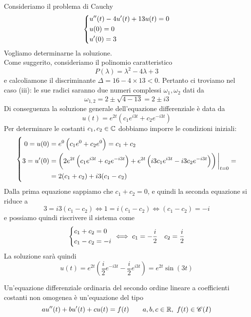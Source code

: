 \begin{example}
    Consideriamo il problema di Cauchy
    \[
    \begin{dcases}
        u''(t)-4u'(t)+13u(t) = 0\\
        u(0) = 0\\
        u'(0)=3
    \end{dcases}
    \]
    Vogliamo determinarne la soluzione. \\
    Come suggerito, consideriamo il polinomio caratteristico 
    \[
    P(\lambda) = \lambda^2-4\lambda +3
    \]
    e calcoliamone il discriminante $\Delta = 16-4\times 13 <0$. Pertanto ci troviamo nel caso (iii): le sue radici saranno due numeri complessi $\omega_1, \omega_2$ dati da
    \[
    \omega_{1,2} = {2\pm \sqrt{4-13}} = 2\pm i3
    \]
    Di conseguenza la soluzione generale dell'equazione differenziale è data da
    \[
    u(t) = e^{2t}\left(c_1 e^{i3t} +c_2 e^{-i3t}\right)
    \]
    Per determinare le costanti $c_1, c_2\in\amsbb{C}$ dobbiamo imporre le condizioni iniziali:
    \[
    \begin{dcases}
        \begin{aligned}
            0 = u(0)&= e^0\left(c_1 e^0 +c_2 e^0\right) = c_1+c_2\\
            3 = u'(0)&= \left(2e^{2t}\left(c_1 e^{i3t}+c_2e^{-i3t}\right)+e^{2t}\left(i3c_1 e^{i3t} -i3c_2 e^{-i3t}\right)\right)\bigg|_{t=0} = \\
            & = 2(c_1+c_2)+i3(c_1-c_2)
        \end{aligned}
    \end{dcases}
    \]
    Dalla prima equazione sappiamo che $c_1+c_2 =0$, e quindi la seconda equazione si riduce a
    \[
    3 = i3(c_1-c_2) \iff 1=i(c_1-c_2) \iff (c_1-c_2) = -i
    \]
    e possiamo quindi riscrivere il sistema come
    \[
    \begin{dcases}
        c_1 + c_2 = 0\\
        c_1 - c_2 = -i 
    \end{dcases} \iff c_1 = -\frac{i}{2} \quad c_2 = \frac{i}{2}
    \]
    La soluzione sarà quindi
    \[
    u(t) = e^{2t}\left(\frac{i}{2}e^{-i3t} -\frac{i}{2}e^{i3t}\right) = e^{2t}\sin(3t)
    \]
\end{example}
\begin{definition}
    \label{def:12.2}
    Un'equazione differenziale ordinaria del secondo ordine lineare a coefficienti costanti non omogenea è un'equazione del tipo
    \[
    au''(t)+bu'(t)+cu(t) = f(t) \qquad a,b,c\in\amsbb{R}, \ f(t)\in\mathscr{C}(I)
    \]
\end{definition}
